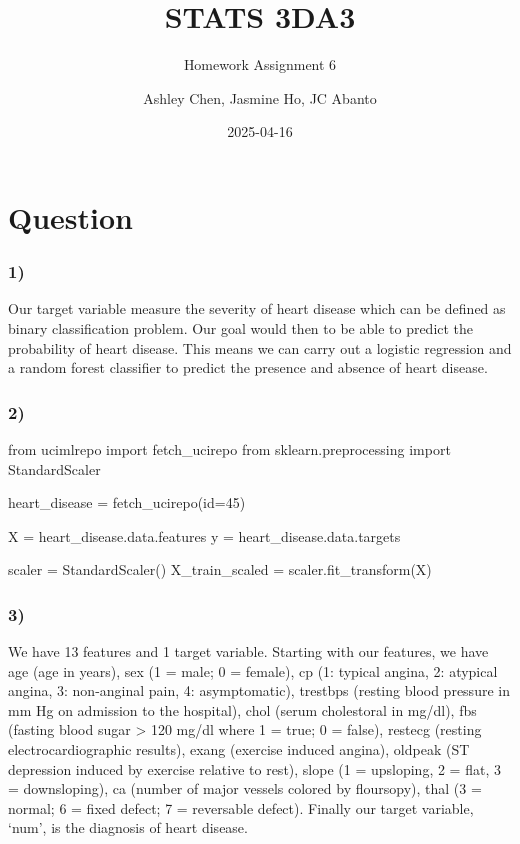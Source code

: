 \documentclass[
  11pt,
  letterpaper,
  DIV=11,
  numbers=noendperiod]{scrartcl}
\title{STATS 3DA3}
\subtitle{Homework Assignment 6}
\author{Ashley Chen, Jasmine Ho, JC Abanto}
\date{2025-04-16}
\newenvironment{Shaded}{\begin{snugshade}}{\end{snugshade}}
\newcommand{\BuiltInTok}[1]{\textcolor[rgb]{0.00,0.23,0.31}{#1}}
\newcommand{\DecValTok}[1]{\textcolor[rgb]{0.68,0.00,0.00}{#1}}
\newcommand{\ImportTok}[1]{\textcolor[rgb]{0.00,0.46,0.62}{#1}}
\newcommand{\NormalTok}[1]{\textcolor[rgb]{0.00,0.23,0.31}{#1}}
\newcommand{\OperatorTok}[1]{\textcolor[rgb]{0.37,0.37,0.37}{#1}}
\begin{document}
\maketitle


\newpage

\section{Question}\label{question}

\subsubsection{1)}\label{section}

Our target variable measure the severity of heart disease which can be
defined as binary classification problem. Our goal would then to be able
to predict the probability of heart disease. This means we can carry out
a logistic regression and a random forest classifier to predict the
presence and absence of heart disease.

\subsubsection{2)}\label{section-1}

\begin{Shaded}
\begin{Highlighting}[]
\ImportTok{from}\NormalTok{ ucimlrepo }\ImportTok{import}\NormalTok{ fetch\_ucirepo}
\ImportTok{from}\NormalTok{ sklearn.preprocessing }\ImportTok{import}\NormalTok{ StandardScaler}
  
\NormalTok{heart\_disease }\OperatorTok{=}\NormalTok{ fetch\_ucirepo(}\BuiltInTok{id}\OperatorTok{=}\DecValTok{45}\NormalTok{) }
 
\NormalTok{X }\OperatorTok{=}\NormalTok{ heart\_disease.data.features }
\NormalTok{y }\OperatorTok{=}\NormalTok{ heart\_disease.data.targets }

\NormalTok{scaler }\OperatorTok{=}\NormalTok{ StandardScaler()}
\NormalTok{X\_train\_scaled }\OperatorTok{=}\NormalTok{ scaler.fit\_transform(X)}
\end{Highlighting}
\end{Shaded}

\subsubsection{3)}\label{section-2}

We have 13 features and 1 target variable. Starting with our features,
we have age (age in years), sex (1 = male; 0 = female), cp (1: typical
angina, 2: atypical angina, 3: non-anginal pain, 4: asymptomatic),
trestbps (resting blood pressure in mm Hg on admission to the hospital),
chol (serum cholestoral in mg/dl), fbs (fasting blood sugar
\textgreater{} 120 mg/dl where 1 = true; 0 = false), restecg (resting
electrocardiographic results), exang (exercise induced angina), oldpeak
(ST depression induced by exercise relative to rest), slope (1 =
upsloping, 2 = flat, 3 = downsloping), ca (number of major vessels
colored by floursopy), thal (3 = normal; 6 = fixed defect; 7 =
reversable defect). Finally our target variable, `num', is the diagnosis
of heart disease.
\end{document}
